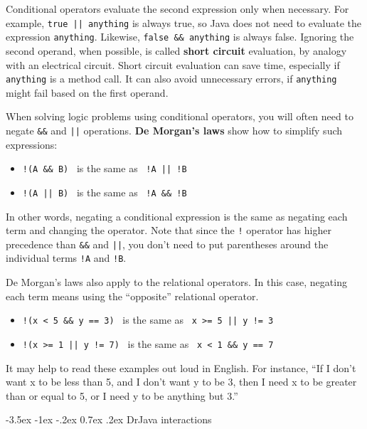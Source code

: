 \documentclass[12pt]{book}
\makeatletter
\renewcommand{\section}{\@startsection {section}{1}{\z@}%
    {-3.5ex \@plus -1ex \@minus -.2ex}%
    {0.7ex \@plus.2ex}%
    {\normalfont\Large\bfseries}}
\theoremstyle{exercise}
\newcommand{\java}[1]{\lstinline{#1}} %
\makeatother
\begin{document}

Conditional operators evaluate the second expression only when necessary.
For example, \java{true || anything} is always true, so Java does not need to evaluate the expression \java{anything}.
Likewise, \java{false && anything} is always false.
Ignoring the second operand, when possible, is called {\bf short circuit} evaluation, by analogy with an electrical circuit.
Short circuit evaluation can save time, especially if \java{anything} is a method call.
It can also avoid unnecessary errors, if \java{anything} might fail based on the first operand.


When solving logic problems using conditional operators, you will often need to negate \java{&&} and \java{||} operations.
{\bf De Morgan's laws} show how to simplify such expressions:

\begin{itemize}
\item \java{!(A && B)} ~is the same as~ \java{!A || !B}
\item \java{!(A || B)} ~is the same as~ \java{!A && !B}
\end{itemize}

In other words, negating a conditional expression is the same as negating each term and changing the operator.
Note that since the \java{!} operator has higher precedence than \java{&&} and \java{||}, you don't need to put parentheses around the individual terms \java{!A} and \java{!B}.

De Morgan's laws also apply to the relational operators.
In this case, negating each term means using the ``opposite'' relational operator.

\begin{itemize}
\item \java{!(x < 5 && y == 3)} ~is the same as~ \java{x >= 5 || y != 3}
\item \java{!(x >= 1 || y != 7)} ~is the same as~ \java{x < 1 && y == 7}
\end{itemize}

It may help to read these examples out loud in English.
For instance, ``If I don't want x to be less than 5, and I don't want y to be 3, then I need x to be greater than or equal to 5, or I need y to be anything but 3.''


\section{DrJava interactions}
\end{document}
